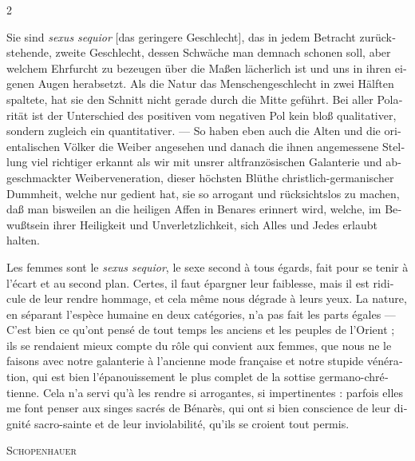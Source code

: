 \documentclass[a4paper,12pt]{article}
\newcommand\chunks[2]{%
\begin{leftcolumn*}\begin{otherlanguage}{german}%
{#1}%
\end{otherlanguage}\end{leftcolumn*}%
\begin{rightcolumn}\begin{otherlanguage}{french}%
{#2}%
\end{otherlanguage}\end{rightcolumn}%
}
\begin{document}
\begin{paracol}{2}
  \chunks{Sie sind \textit{sexus sequior} [das geringere Geschlecht], das in jedem Betracht zurückstehende, zweite Geschlecht, dessen Schwäche man demnach schonen soll, aber welchem Ehrfurcht zu bezeugen über die Maßen lächerlich ist und uns in ihren eigenen Augen herabsetzt. Als die Natur das Menschengeschlecht in zwei Hälften spaltete, hat sie den Schnitt nicht gerade durch die Mitte geführt. Bei aller Polarität ist der Unterschied des positiven vom negativen Pol kein bloß qualitativer, sondern zugleich ein quantitativer. --- So haben eben auch die Alten und die orientalischen Völker die Weiber angesehen und danach die ihnen angemessene Stellung viel richtiger erkannt als wir mit unsrer altfranzösischen Galanterie und abgeschmackter Weiberveneration, dieser höchsten Blüthe christlich-germanischer Dummheit, welche nur gedient hat, sie so arrogant und rücksichtslos zu machen, daß man bisweilen an die heiligen Affen in Benares erinnert wird, welche, im Bewußtsein ihrer Heiligkeit und Unverletzlichkeit, sich Alles und Jedes erlaubt halten.}
         {Les femmes sont le \textit{sexus sequior}, le sexe second à tous égards, fait pour se tenir à l’écart et au second plan. Certes, il faut épargner leur faiblesse, mais il est ridicule de leur rendre hommage, et cela même nous dégrade à leurs yeux. La nature, en séparant l’espèce humaine en deux catégories, n’a pas fait les parts égales\textelp{} --- C’est bien ce qu’ont pensé de tout temps les anciens et les peuples de l’Orient ; ils se rendaient mieux compte du rôle qui convient aux femmes, que nous ne le faisons avec notre galanterie à l’ancienne mode française et notre stupide vénération, qui est bien l’épanouissement le plus complet de la sottise germano-chrétienne. Cela n’a servi qu’à les rendre si arrogantes, si impertinentes : parfois elles me font penser aux singes sacrés de Bénarès, qui ont si bien conscience de leur dignité sacro-sainte et de leur inviolabilité, qu’ils se croient tout permis.}

  \chunks{\begin{flushright}
          \large\textsc{Schopenhauer}
          \end{flushright}}
         {}
\end{paracol}
\end{document}
